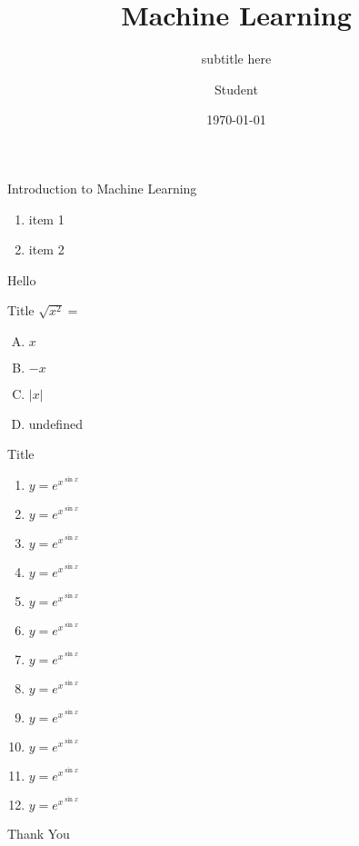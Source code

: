 \documentclass[11pt]{beamer}
\title{Machine Learning}
\subtitle{subtitle here}
\author{Student}
\institute{NIT Durgapur}
\date{\today}
\begin{document}
\begin{frame}
	\titlepage
\end{frame}

\begin{frame}[t]{Introduction to Machine Learning}
\begin{enumerate}
	\item item 1
	\item item 2
\end{enumerate}
	Hello
\end{frame}

\begin{frame}{Title}\vspace{10pt}
$\sqrt{x^2} = $\\[10pt]
\begin{enumerate}[(A)]
\item $x$
\item $-x$
\item $|x|$
\item undefined
\end{enumerate}
\end{frame}

\begin{frame}{Title}\vspace{10pt}
\begin{enumerate}
\item $y = e^{x^{\sin x}}$
\item $y = e^{x^{\sin x}}$
\item $y = e^{x^{\sin x}}$
\item $y = e^{x^{\sin x}}$
\item $y = e^{x^{\sin x}}$
\item $y = e^{x^{\sin x}}$
\item $y = e^{x^{\sin x}}$
\item $y = e^{x^{\sin x}}$
\item $y = e^{x^{\sin x}}$
\item $y = e^{x^{\sin x}}$
\item $y = e^{x^{\sin x}}$
\item $y = e^{x^{\sin x}}$
\end{enumerate}
\end{frame}

\begin{frame}[standout]
Thank You
\end{frame}
\end{document}
